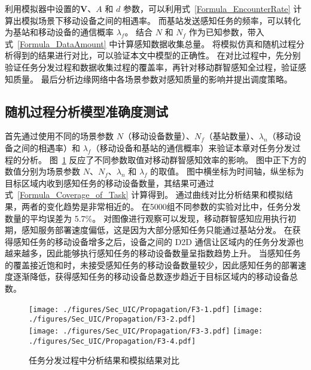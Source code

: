利用模拟器中设置的$\boldsymbol{V}$、$A$ 和 $d$ 参数，可以利用式~\eqref{Formula_EncounterRate} 计算出模拟场景下移动设备之间的相遇率。
而基站发送感知任务的频率，可以转化为基站和移动设备的通信概率 $\lambda_f$。
结合 $N$ 和 $N_f$ 作为已知参数，带入式~\eqref{Formula_DataAmount} 中计算感知数据收集总量。
将模拟仿真和随机过程分析得到的结果进行对比，可以验证本文中模型的正确性。
在对比过程中，先分别验证任务分发过程和数据收集过程的覆盖率，再针对移动群智感知全过程，验证感知质量。
最后分析边缘网络中各场景参数对感知质量的影响并提出调度策略。


\subsection{随机过程分析模型准确度测试}

首先通过使用不同的场景参数 $N$（移动设备数量）、$N_f$（基站数量）、$\lambda_n$（移动设备之间的相遇率）和 $\lambda_f$（移动设备和基站的通信概率）来验证本章对任务分发过程的分析。
图~\ref{Figure_PropagationTest} 反应了不同参数取值对移动群智感知效率的影响。
图中正下方的数值分别为场景参数 $N$、$N_f$、$\lambda_n$ 和 $\lambda_f$ 的取值。
图中横坐标为时间轴，纵坐标为目标区域内收到感知任务的移动设备数量，其结果可通过式~\eqref{Formula_Coverage_of_Task} 计算得到。
通过曲线对比分析结果和模拟结果，两者的变化趋势是非常相近的。
在5000组不同参数的实验对比中，任务分发数量的平均误差为 5.7\%。
对图像进行观察可以发现，移动群智感知应用执行初期，感知服务部署速度偏低，这是因为大部分感知任务只能通过基站分发。
在获得感知任务的移动设备增多之后，设备之间的 D2D 通信让区域内的任务分发源也越来越多，因此能够执行感知任务的移动设备数量呈指数趋势上升。
当感知任务的覆盖接近饱和时，未接受感知任务的移动设备数量较少，因此感知任务的部署速度逐渐降低，获得感知任务的移动设备总数逐步趋近于目标区域内的移动设备总数。

\begin{figure}[!h]
  \centering
  {\texttt{[image: ./figures/Sec\_UIC/Propagation/F3-1.pdf]}}
  {\texttt{[image: ./figures/Sec\_UIC/Propagation/F3-2.pdf]}}\\
  {\texttt{[image: ./figures/Sec\_UIC/Propagation/F3-3.pdf]}}
  {\texttt{[image: ./figures/Sec\_UIC/Propagation/F3-4.pdf]}}
  \vspace{-0.5em}
  \caption{任务分发过程中分析结果和模拟结果对比}
  \vspace{-0.5em}
  \label{Figure_PropagationTest}
\end{figure}


